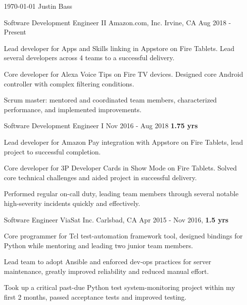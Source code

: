 \documentclass[11pt, a4paper]{awesome-cv}
\begin{document}
\makecvheader

\makecvfooter
  {\today}
  {Justin Bass}
  {} %

\begin{cventries}

	\cventry
	{Software Development Engineer II} %
	{Amazon.com, Inc.} %
	{Irvine, CA} %
	{Aug 2018 - Present \textbf{}} %
	{
		\begin{cvitems} %
			\item {Lead developer for Apps and Skills linking in Appstore on Fire Tablets. Lead several developers across 4 teams to a successful delivery.}
			\item {Core developer for Alexa Voice Tips on Fire TV devices. Designed core Android controller with complex filtering conditions.}
			\item {Scrum master: mentored and coordinated team members, characterized performance, and implemented improvements.}
		\end{cvitems}
	}
	
	\cventry
	{Software Development Engineer I}
	{}
	{}
	{Nov 2016 - Aug 2018 \textbf{1.75 yrs}} {
		\begin{cvitems} %
			\item {Lead developer for Amazon Pay integration with Appstore on Fire Tablets, lead project to successful completion.}
			\item {Core developer for 3P Developer Cards in Show Mode on Fire Tablets. Solved core technical challenges and aided project in successful delivery.}
			\item {Performed regular on-call duty, leading team members through several notable high-severity incidents quickly and effectively.}
		\end{cvitems}
	}
	
	\cventry
	{Software Engineer} %
	{ViaSat Inc.} %
	{Carlsbad, CA} %
	{Apr 2015 - Nov 2016, \textbf{1.5 yrs}} %
	{
		\begin{cvitems} %
			\item {Core programmer for Tcl test-automation framework tool, designed bindings for Python while mentoring and leading two junior team members.}
			\item {Lead team to adopt Ansible and enforced dev-ops practices for server maintenance, greatly improved reliability and reduced manual effort.}
			\item {Took up a critical past-due Python test system-monitoring project within my first 2 months, passed acceptance tests and improved testing.}
		\end{cvitems}
	}
	

\end{cventries}
\end{document}
